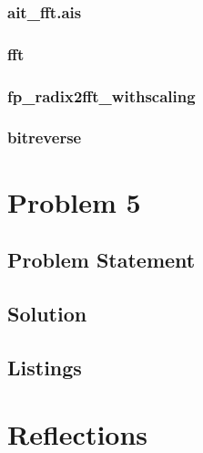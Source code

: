 \documentclass[12pt,a4paper,titlepage,oneside]{article}
\begin{document}
\subsubsection{ait\_fft.ais}



\subsubsection{fft}



\subsubsection{fp\_radix2fft\_withscaling}



\subsubsection{bitreverse}




\newpage
\section{Problem 5}

\subsection{Problem Statement}


\subsection{Solution}

\subsection{Listings}

\newpage
\section{Reflections}


\end{document}
